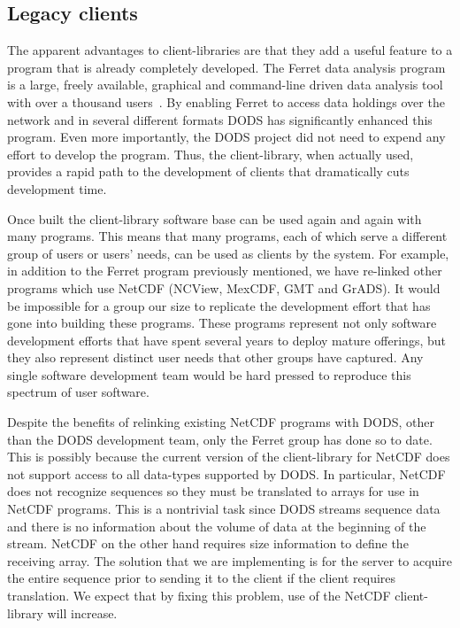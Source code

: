 \documentclass{article}
\begin{document}
\subsection{Legacy clients}
\label{lc}

The apparent advantages to client-libraries are that they add a useful
feature to a program that is already completely developed. The Ferret data
analysis program is a large, freely available, graphical and command-line
driven data analysis tool with over a thousand users~\cite{ferret}. By
enabling Ferret to access data holdings over the network and in several
different formats \ac{DODS} has significantly enhanced this program. Even
more importantly, the \ac{DODS} project did not need to expend any effort to
develop the program. Thus, the client-library, when actually used, provides a
rapid path to the development of clients that dramatically cuts development
time.

Once built the client-library software base can be used again and again with
many programs. This means that many programs, each of which serve a different
group of users or users' needs, can be used as clients by the system. For
example, in addition to the Ferret program previously mentioned, we have
re-linked other programs which use \acs{NetCDF} (NCView, MexCDF, GMT and 
GrADS). It would be impossible for a group our size to replicate the
development effort that has gone into building these programs.  These
programs represent not only software development efforts that have spent
several years to deploy mature offerings, but they also represent distinct
user needs that other groups have captured.  Any single software development
team would be hard pressed to reproduce this spectrum of user software.

Despite the benefits of relinking existing \acs{NetCDF} 
programs with \acs{DODS}, other than the \acs{DODS} development team, 
only the Ferret group has done so to date. This is possibly because 
the current version of the client-library for \acs{NetCDF} does not 
support access to all data-types supported by \acs{DODS}. In particular, 
\acs{NetCDF} does not recognize sequences so they must be translated 
to arrays for use in \acs{NetCDF} programs. This is a nontrivial task
since \acs{DODS} streams sequence data and there is no information
about the volume of data at the beginning of the stream. \acs{NetCDF} 
on the other hand requires size information to define the receiving array. 
The solution that we are implementing is for the server to acquire the 
entire sequence prior to sending it to the client if the client requires 
translation. We expect that by fixing this problem, use of the \acs{NetCDF} 
client-library will increase. 
\end{document}
